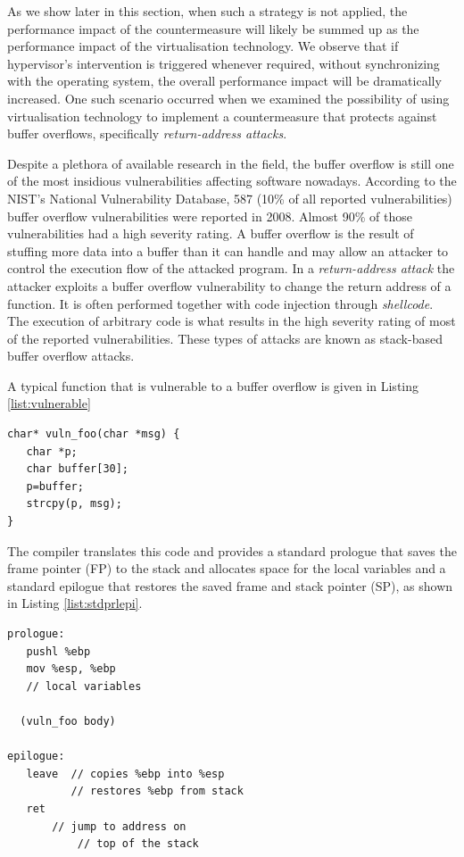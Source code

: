 As we show later in this section, when such a strategy is not applied, the performance impact of the countermeasure will likely be summed up as the performance impact of the virtualisation technology. We observe that if hypervisor's intervention is triggered whenever required, without synchronizing with the operating system, the overall performance impact will be dramatically increased. One such scenario occurred when we examined the possibility of using virtualisation technology to implement a countermeasure that protects against buffer overflows, specifically \emph{return-address attacks}. 

Despite a plethora of available research in the field, the buffer overflow is still one of the most insidious vulnerabilities affecting software nowadays. According to the NIST's National Vulnerability Database\cite{nist}, 587 (10\% of all reported vulnerabilities) buffer overflow vulnerabilities were reported in 2008. Almost 90\% of those vulnerabilities had a high severity rating.
A buffer overflow is the result of stuffing more data into a buffer than it can handle and may allow an attacker to control the execution flow of the attacked program. In a \emph{return-address attack} the attacker exploits a buffer overflow vulnerability to change the return address of a function. It is often performed together with code injection through \emph{shellcode}. 
The execution of arbitrary code is what results in the high severity rating of most of the reported vulnerabilities. These types of attacks are known as stack-based buffer overflow attacks.

A typical function that is vulnerable to a buffer overflow is given in Listing \ref{list:vulnerable}

\begin{lstlisting}[caption=A function that is vulnerable to buffer overflow, label= list:vulnerable]
char* vuln_foo(char *msg) {
   char *p;
   char buffer[30];
   p=buffer;
   strcpy(p, msg);
}
\end{lstlisting}    
\vspace{5mm}

The compiler translates this code and provides a standard prologue that saves the frame pointer (FP) to the stack and allocates space for the local variables and a standard epilogue that restores the saved frame and stack pointer (SP), as shown in Listing \ref{list:stdprlepi}.


\begin{lstlisting}[caption=The standard prologue and epilogue of vuln\_foo(), label= list:stdprlepi]
prologue:
   pushl %ebp
   mov %esp, %ebp
   // local variables
   
  (vuln_foo body)

epilogue:
   leave  // copies %ebp into %esp
     	  // restores %ebp from stack
   ret
	   // jump to address on 
           // top of the stack
\end{lstlisting}    
\vspace{5mm}

